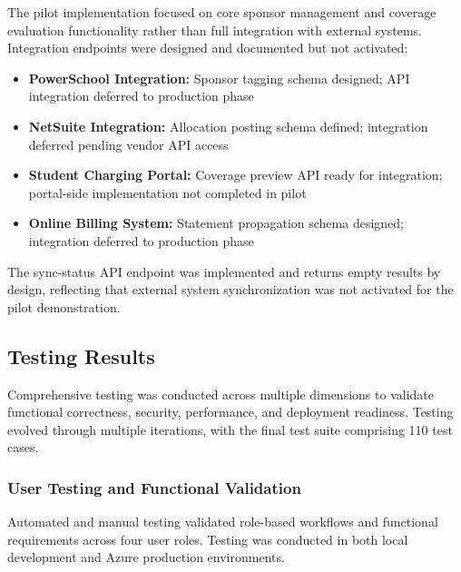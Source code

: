 The pilot implementation focused on core sponsor management and coverage evaluation functionality rather than full integration with external systems. Integration endpoints were designed and documented but not activated:

\begin{itemize}
    \item \textbf{PowerSchool Integration:} Sponsor tagging schema designed; API integration deferred to production phase
    \item \textbf{NetSuite Integration:} Allocation posting schema defined; integration deferred pending vendor API access
    \item \textbf{Student Charging Portal:} Coverage preview API ready for integration; portal-side implementation not completed in pilot
    \item \textbf{Online Billing System:} Statement propagation schema designed; integration deferred to production phase
\end{itemize}

The sync-status API endpoint was implemented and returns empty results by design, reflecting that external system synchronization was not activated for the pilot demonstration.

\subsection{Testing Results}

Comprehensive testing was conducted across multiple dimensions to validate functional correctness, security, performance, and deployment readiness. Testing evolved through multiple iterations, with the final test suite comprising 110 test cases.

\subsubsection{User Testing and Functional Validation}

Automated and manual testing validated role-based workflows and functional requirements across four user roles. Testing was conducted in both local development and Azure production environments.

